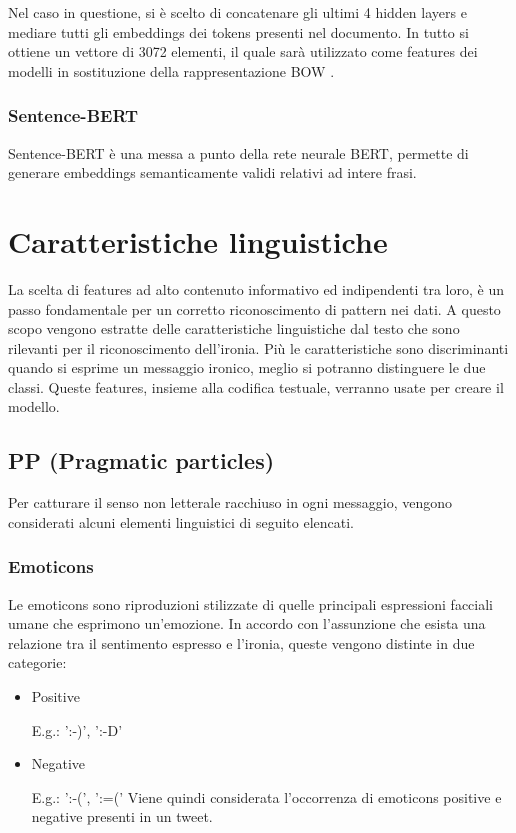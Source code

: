 \documentclass[oneside]{book}
\begin{document}
\noindent
Nel caso in questione, si è scelto di concatenare gli ultimi 4 hidden layers e mediare tutti gli embeddings dei tokens presenti nel documento. In tutto si ottiene un vettore di 3072 elementi, il quale sarà utilizzato come features dei modelli in sostituzione della rappresentazione BOW \cite{berttutorial}.

\subsubsection{Sentence-BERT}
Sentence-BERT\cite{sentencebert} è una messa a punto della rete neurale BERT, permette di generare embeddings semanticamente validi relativi ad intere frasi.

\section{Caratteristiche linguistiche}
La scelta di features ad alto contenuto informativo ed indipendenti tra loro, è un passo fondamentale per un corretto riconoscimento di pattern nei dati.
A questo scopo vengono estratte delle caratteristiche linguistiche dal testo che sono rilevanti per il riconoscimento dell'ironia. Più le caratteristiche sono discriminanti quando si esprime un messaggio ironico, meglio si potranno distinguere le due classi. Queste features, insieme alla codifica testuale, verranno usate per creare il modello.

\subsection{PP (Pragmatic particles)}
Per catturare il senso non letterale racchiuso in ogni messaggio, vengono considerati alcuni elementi linguistici di seguito elencati.

\subsubsection{Emoticons}
Le emoticons sono riproduzioni stilizzate di quelle principali espressioni facciali umane che esprimono un'emozione. In accordo con l'assunzione che esista una relazione tra il sentimento espresso e l'ironia, queste vengono distinte in due categorie:
\begin{itemize}
	\item
	Positive
	
	E.g.: ':-)', ':-D'
	\item
	Negative
	
	E.g.: ':-(', ':=('
Viene quindi considerata l'occorrenza di emoticons positive e negative presenti in un tweet.
\end{itemize}
\end{document}

